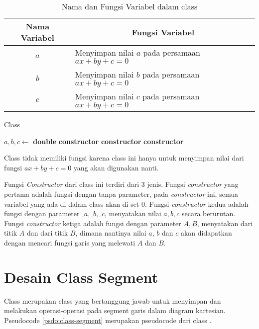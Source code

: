 \begin{table}[]
	\Centering
	\begin{tabular}{|c|p{7cm}|}
	\hline
	Nama Variabel & \multicolumn{1}{c|}{Fungsi Variabel}                               \\ \hline
$a$           & Menyimpan nilai $a$ pada persamaan $ax + by + c =0$ \\ \hline
$b$           & Menyimpan nilai $b$ pada persamaan $ax + by + c =0$          \\ \hline
$c$           & Menyimpan nilai $c$ pada persamaan $ax + by + c =0$          \\ \hline
	\end{tabular}
	\caption{Nama dan Fungsi Variabel dalam class }
	\label{tab:var-line}
\end{table}
\begin{algorithm}
	\caption{Class }
	\label{psdo:class-line}
	\begin{algorithmic}[1]
        \State $ a, b, c \leftarrow $ \textbf{double}
		\State \textbf{constructor} 
        \State \textbf{constructor} 
        \State \textbf{constructor} 
	\end{algorithmic}
\end{algorithm}

Class  tidak memiliki fungsi karena class ini hanya untuk menyimpan nilai dari fungsi $ax+by+c=0$ yang akan digunakan nanti.

Fungsi \textit{Constructor} dari class ini terdiri dari 3 jenis. Fungsi \textit{constructor} yang pertama adalah fungsi dengan tanpa parameter, pada \textit{constructor} ini, semua variabel yang ada di dalam class  akan di set $0$. Fungsi \textit{constructor} kedua adalah fungsi dengan parameter $\_a, \_b, \_c$, menyatakan nilai $a, b, c$ secara berurutan. Fungsi \textit{constructor} ketiga adalah fungsi dengan parameter $A, B$, menyatakan  dari titik $A$ dan  dari titik $B$, dimana nantinya nilai $a$, $b$ dan $c$ akan didapatkan dengan mencari fungsi garis yang melewati  $A$ dan  $B$.

\section{Desain Class Segment}
Class  merupakan class yang bertanggung jawab untuk menyimpan dan melakukan operasi-operasi pada segment garis dalam diagram kartesian. Pseudocode \ref{psdo:class-segment} merupakan pseudocode dari class . 

